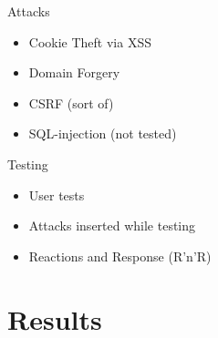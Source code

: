 \documentclass{beamer}
\begin{document}
\begin{frame}{Attacks}
    \begin{itemize}
        \item Cookie Theft via XSS
        \item Domain Forgery
        \item CSRF (sort of)
        \item SQL-injection (not tested)
    \end{itemize}
\end{frame}

\begin{frame}{Testing}
    \begin{itemize}
        \item User tests
        \item Attacks inserted while testing
        \item Reactions and Response (R'n'R)
    \end{itemize}
\end{frame}

\section{Results}
\end{document}
